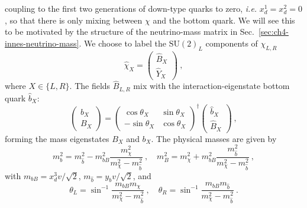 coupling to the first two generations of down-type quarks to zero, \textit{i.e.}
$x_{d}^{1} = x_{d}^{2} = 0$, so that there is only mixing between $\chi$ and the
bottom quark. We will see this to be motivated by the structure of the
neutrino-mass matrix in Sec.~\ref{sec:ch4-innes-neutrino-mass}. We choose to
label the $\mathrm{SU}(2)_{L}$ components of $\chi_{L,R}$
\begin{equation}
  \hat{\chi}_{X} = \begin{pmatrix} \hat{B}_{X} \\ \hat{Y}_{X} \end{pmatrix} \ ,
\end{equation}
where $X \in \{L, R\}$. The fields $\hat{B}_{L,R}$ mix with the
interaction-eigenstate bottom quark $\hat{b}_{X}$:
\begin{equation}
  \label{eq:ch4-b-mixing}
  \begin{pmatrix} b_{X} \\ B_{X} \end{pmatrix} = \begin{pmatrix}
    \cos \theta_{X} & \sin \theta_{X} \\
    -\sin \theta_{X} & \cos \theta_{X}
  \end{pmatrix}^{\dagger} \begin{pmatrix} \hat{b}_{X} \\ \hat{B}_{X} \end{pmatrix} \ ,
\end{equation}
forming the mass eigenstates $B_{X}$ and $b_{X}$. The physical masses are given by
\begin{equation}
  m_{b}^{2} = m_{\hat{b}}^{2} - m_{bB}^{2} \frac{m_{\chi}^{2}}{m_{\chi}^{2} - m_{\hat{b}}^{2}} \ ,\quad
  m_{B}^{2} = m_{\chi}^{2} + m_{bB}^{2} \frac{m_{\hat{b}}^{2}}{m_{\chi}^{2} - m_{\hat{b}}^{2}} \ ,
\end{equation}
with $m_{bB} = x_{d}^{3}v / \sqrt{2}$, $m_{\hat{b}} = y_{b} v / \sqrt{2}$, and
\begin{equation}
  \label{eq:ch4-bmixing}
  \theta_{L} = \sin^{-1} \frac{m_{bB} m_{\chi}}{m_{\chi}^{2} - m_{\hat{b}}^{2}} \ , \quad
  \theta_{R} = \sin^{-1} \frac{m_{bB} m_{\hat{b}}}{m_{\chi}^{2} - m_{\hat{b}}^{2}} \ .
\end{equation}

